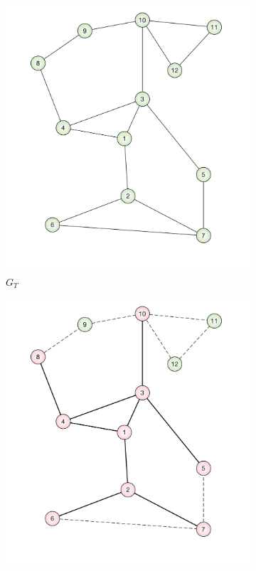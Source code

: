 \documentclass[reqno,8pt]{amsart}
\theoremstyle{definition}
\theoremstyle{remark}
\numberwithin{equation}{section}
\begin{document}
\begin{figure}
\begin{subfigure}{.2\textwidth}
  \centering
  \includegraphics[width=.8\linewidth]{teixieraNetwork2014.pdf}
  \caption{$G_T$}
  \label{fig:TeixierasNetworkCut}
\end{subfigure}%
\begin{subfigure}{.2\textwidth}
  \centering
  \includegraphics[width=.8\linewidth]{teixieraNetwork2014_proximityGraph.pdf}

\end{subfigure}
\end{figure}
\end{document}
